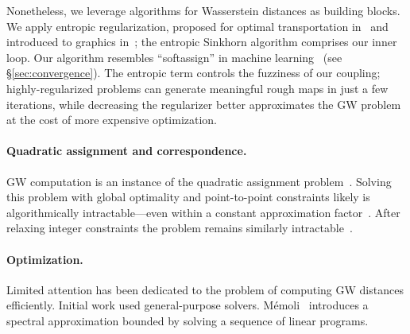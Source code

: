 
Nonetheless, we leverage algorithms for Wasserstein distances as building blocks.  We apply entropic regularization, proposed for optimal transportation in~\cite{cuturi-2013,benamou-2015} and introduced to graphics in~\cite{solomon-2015}; the entropic Sinkhorn algorithm comprises our inner loop.  Our algorithm resembles ``softassign'' in machine learning~\cite{rangarajan-1997} (see \S\ref{sec:convergence}).  The entropic term controls the fuzziness of our coupling; highly-regularized problems can generate meaningful rough maps in just a few iterations, while decreasing the regularizer better approximates the GW problem at the cost of more expensive optimization.


\paragraph*{Quadratic assignment and correspondence.}  GW computation is an instance of the quadratic assignment problem~\cite{pardalos-1994,loiola-2007,cela-2013}.  Solving this problem with global optimality and point-to-point constraints likely is algorithmically intractable---even within a constant approximation factor~\cite{sahni-1976}.  After relaxing integer constraints the problem remains similarly intractable~\cite{sahni-1974}.


\paragraph*{Optimization.}  Limited attention has been dedicated to the problem of computing GW distances efficiently.  Initial work used general-purpose solvers.  M\'emoli~ introduces a spectral approximation bounded by solving a sequence of linear programs.  

